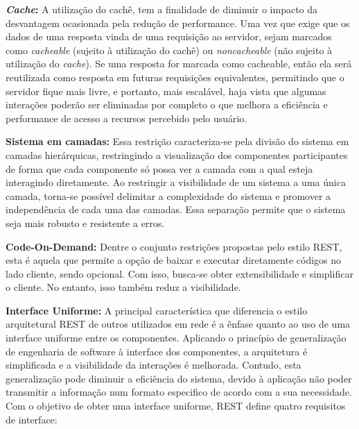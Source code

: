 \textbf{\emph{Cache}:} A utilização do cachê, tem  a finalidade de diminuir o impacto da desvantagem ocasionada pela redução de performance. Uma vez que exige que os dados de uma resposta vinda de uma requisição ao servidor, sejam marcados como \emph{cacheable} (sujeito à utilização do cachê) ou \emph{noncacheable} (não sujeito à utilização do \emph{cache}). Se uma resposta for marcada como cacheable, então ela será reutilizada como resposta em futuras requisições equivalentes, permitindo que o servidor fique mais livre, e portanto, mais escalável, haja vista que algumas interações poderão ser eliminadas por completo o que melhora a eficiência e  performance  de acesso a recursos percebido pelo usuário.

\textbf{Sistema em camadas:} Essa restrição caracteriza-se pela divisão do sistema em camadas hierárquicas, restringindo a visualização dos componentes participantes de forma que cada componente só possa ver a camada com a qual esteja interagindo diretamente. Ao restringir a visibilidade de um sistema a uma única camada, torna-se possível delimitar a complexidade do sistema e promover a independência de cada uma das camadas.  Essa separação permite que  o sistema seja mais robusto e resistente a erros.

\textbf{Code-On-Demand:} Dentre o conjunto restrições propostas pelo estilo REST, esta é aquela que permite a opção de baixar e executar diretamente códigos no  lado cliente, sendo opcional. Com isso, busca-se  obter extensibilidade e simplificar  o cliente. No entanto, isso também reduz a visibilidade.

\textbf{Interface Uniforme:} A principal característica que diferencia o estilo arquitetural REST de outros utilizados em rede é a ênfase  quanto ao uso de uma interface uniforme entre os componentes. Aplicando o princípio de generalização de engenharia de software à interface dos componentes, a arquitetura é simplificada e a visibilidade da interações é melhorada. Contudo, esta generalização pode diminuir a eficiência do sistema, devido à aplicação não poder transmitir a informação num formato especifico de acordo com a sua  necessidade.  Com o objetivo de obter uma interface uniforme, REST define quatro requisitos de interface:

